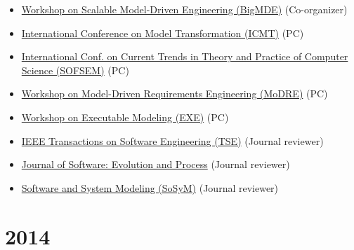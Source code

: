 \begin{itemize}
\tightlist
\item
  \href{https://big-mde.github.io/2015.html}{Workshop on Scalable
  Model-Driven Engineering (BigMDE)} (Co-organizer)
\item
  \href{http://www.di.univaq.it/diruscio/sites/ICMT2015/}{International
  Conference on Model Transformation (ICMT)} (PC)
\item
  \href{http://www.sofsem.cz/sofsem15/}{International Conf. on Current
  Trends in Theory and Practice of Computer Science (SOFSEM)} (PC)
\item
  \href{http://www.modre2015.ece.mcgill.ca/}{Workshop on Model-Driven
  Requirements Engineering (MoDRE)} (PC)
\item
  \href{http://www.modelexecution.org/?page_id=1619}{Workshop on
  Executable Modeling (EXE)} (PC)
\item
  \href{https://www.computer.org/web/tse;jsessionid=6afd856a99689b17c0c58edc329c}{IEEE
  Transactions on Software Engineering (TSE)} (Journal reviewer)
\item
  \href{http://onlinelibrary.wiley.com/journal/10.1002/(ISSN)2047-7481}{Journal
  of Software: Evolution and Process} (Journal reviewer)
\item
  \href{http://www.sosym.org/}{Software and System Modeling (SoSyM)}
  (Journal reviewer)
\end{itemize}

\hypertarget{section-9}{%
\section{2014}\label{section-9}}

